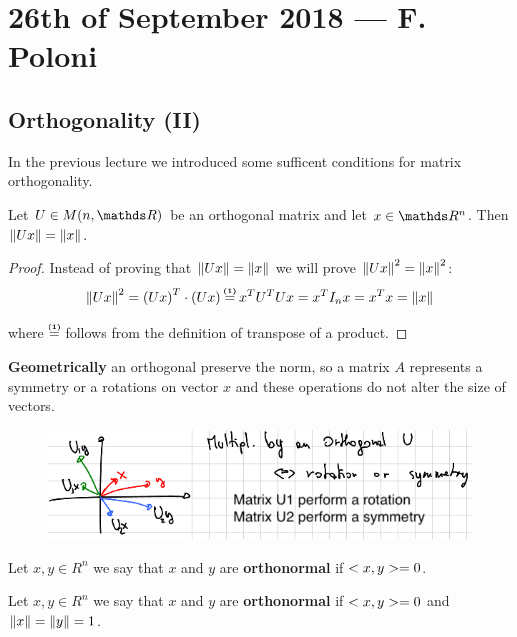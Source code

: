\documentclass[computationalMathematics.tex]{subfiles}
\begin{document}
\section{26th of September 2018 --- F. Poloni}

\subsection{Orthogonality (II)}
In the previous lecture we introduced some sufficent conditions for matrix orthogonality.

\begin{theorem}
  Let $U \in M(n, \R)$ be an orthogonal matrix and let $x \in \R^n$. Then $\left\lVert Ux\right\rVert = \left\lVert x\right\rVert$.
\end{theorem}

\begin{proof}
  Instead of proving that $\left\lVert Ux\right\rVert = \left\lVert x\right\rVert$ we will prove $\left\lVert Ux\right\rVert^2 = \left\lVert x\right\rVert^2$:\\
  
  $$\norm{Ux}^2 = \tr{(Ux)} \cdot (Ux) \numeq{(1)} \tr{x} \tr{U} U x = \tr{x} I_n x = \tr{x} x = \norm{x}$$

  where $\numeq{(1)}$ follows from the definition of transpose of a product.
\end{proof}

\textbf{Geometrically} an orthogonal preserve the norm, so a matrix $A$ represents a symmetry or a rotations on vector $x$ and these operations do not alter the size of vectors.

\begin{figure}[H]
    \centering
    \includegraphics[scale = 0.5]{pics/26sett/orthgonal.png}
\end{figure}

\begin{definition}[Orthogonality]
  Let $x, y \in R^n$ we say that $x$ and $y$ are \textbf{orthonormal} if $<x, y> = 0$.
\end{definition}

\begin{definition}[Orthonormality]
  Let $x, y \in R^n$ we say that $x$ and $y$ are \textbf{orthonormal} if $<x, y> = 0$ and $\left\lVert x\right\rVert = \left\lVert y\right\rVert = 1$.
\end{definition}
\end{document}
